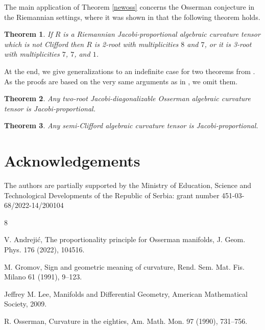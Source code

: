 \documentclass[preprint]{elsarticle}
\newtheorem{theorem}{Theorem}%
\begin{document}
The main application of Theorem \ref{newoss} concerns the Osserman conjecture in the Riemannian settings,
where it was shown in \cite[Theorem 5]{A9} that the following theorem holds.
\begin{theorem}\label{propoo}
If $R$ is a Riemannian Jacobi-proportional algebraic curvature tensor which is not Clifford then $R$ is 2-root with multiplicities $8$ and $7$,
or it is 3-root with multiplicities $7$, $7$, and $1$.
\end{theorem}

At the end, we give generalizations to an indefinite case for two theorems from \cite[Theorems 3 and 4]{A9}.
As the proofs are based on the very same arguments as in \cite{A9}, we omit them.

\begin{theorem}\label{propo1}
Any two-root Jacobi-diagonalizable Osserman algebraic curvature tensor is Jacobi-proportional.
\end{theorem}

\begin{theorem}\label{propo2}
Any semi-Clifford algebraic curvature tensor is Jacobi-proportional.
\end{theorem}



\section*{Acknowledgements}

The authors are partially supported by the Ministry of Education, Science and Technological
Developments of the Republic of Serbia: grant number 451-03-68/2022-14/200104




\begin{thebibliography}{8}

V. Andreji\'c, The proportionality principle for Osserman manifolds, 
J. Geom. Phys. 176 (2022), 104516.

M. Gromov, {Sign and geometric meaning of curvature}, 
Rend. Sem. Mat. Fis. Milano 61 (1991), 9--123.

Jeffrey M. Lee, Manifolds and Differential Geometry, American Mathematical Society, 2009.

 R. Osserman, {Curvature in the eighties}, 
Am. Math. Mon. 97 (1990), 731--756.

\end{thebibliography}
\end{document}
